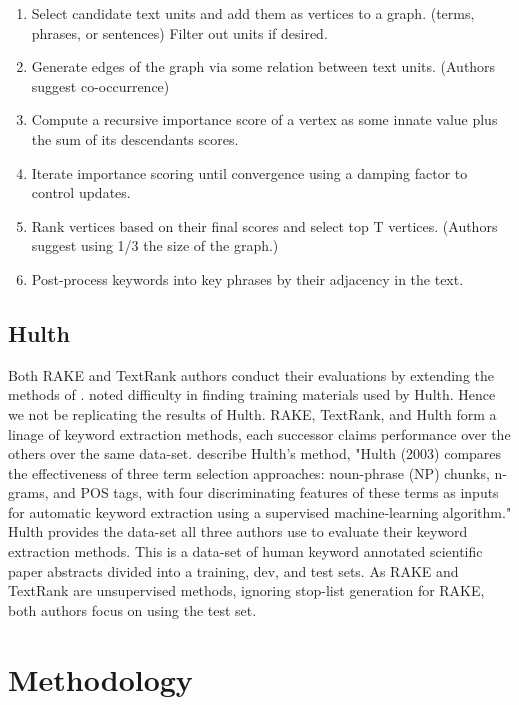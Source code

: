 \documentclass[11pt,a4paper]{article}
\begin{document}
\begin{enumerate}
\small \itemsep0em 

\item Select candidate text units and add them as vertices to a graph. (terms, phrases, or sentences) Filter out units if desired. 
\item Generate edges of the graph via some relation between text units. (Authors suggest co-occurrence)
\item Compute a recursive importance score of a vertex as some innate value plus the sum of its descendants scores.    
\item Iterate importance scoring until convergence using a damping factor to control updates.
\item Rank vertices based on their final scores and select top T vertices. (Authors suggest using 1/3 the size of the graph.)
\item Post-process keywords into key phrases by their adjacency in the text.

\normalsize
\end{enumerate}   

\subsection{Hulth}

Both RAKE and TextRank authors conduct their evaluations by extending the methods of \citet{hulth-2003-improved}. \citet{1} noted difficulty in finding training materials used by Hulth. Hence we not be replicating the results of Hulth. RAKE, TextRank, and Hulth form a linage of keyword extraction methods, each successor claims performance over the others over the same data-set. \citet{1} describe Hulth's method, "Hulth (2003) compares the effectiveness of three term selection approaches: noun-phrase (NP) chunks, n-grams, and POS tags, with four discriminating features of these terms as inputs for automatic keyword extraction using a supervised machine-learning algorithm." Hulth provides the data-set all three authors use to evaluate their keyword extraction methods. This is a data-set of human keyword annotated scientific paper abstracts divided into a training, dev, and test sets. As RAKE and TextRank are unsupervised methods, ignoring stop-list generation for RAKE, both authors focus on using the test set. 

\section{Methodology}
\end{document}
